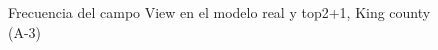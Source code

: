 \begin{figure}[H]
    \centering
    
    \caption{Frecuencia del campo View en el modelo real y top2+1, King county (A-3)}
    \label{frecuency-top2+1-view}
\end{figure}